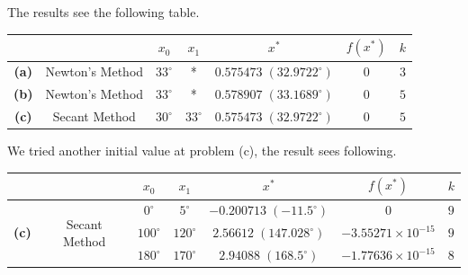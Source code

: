 \documentclass[11pt,en]{elegantpaper}
\begin{document}
The results see the following table.

\begin{table}[htbp]
  \centering
  \begin{tabular}{|cc|c|c|c|c|c|}
  \hline
  \multicolumn{2}{|c|}{\textbf{}}                      & \textbf{$x_0$} & \textbf{$x_1$} & \textbf{$x^*$}              & \textbf{$f(x^*)$} & \textbf{$k$} \\ \hline
  \multicolumn{1}{|c|}{\textbf{(a)}} & Newton's Method & $33^\circ$     & *              & $0.575473\;(32.9722^\circ)$ & $0$               & $3$          \\ \hline
  \multicolumn{1}{|c|}{\textbf{(b)}} & Newton's Method & $33^\circ$     & *              & $0.578907\;(33.1689^\circ)$ & $0$               & $5$          \\ \hline
  \multicolumn{1}{|c|}{\textbf{(c)}} & Secant Method   & $30^\circ$     & $33^\circ$     & $0.575473\;(32.9722^\circ)$ & $0$               & $5$          \\ \hline
  \end{tabular}
\end{table}

We tried another initial value at problem (c), the result sees following.

\begin{table}[htbp]
  \centering
  \begin{tabular}{|cc|c|c|c|c|c|}
  \hline
  \multicolumn{2}{|c|}{\textbf{}}                                                      & \textbf{$x_0$} & \textbf{$x_1$} & \textbf{$x^*$}             & \textbf{$f(x^*)$}         & \textbf{$k$} \\ \hline
  \multicolumn{1}{|c|}{\multirow{3}{*}{\textbf{(c)}}} & \multirow{3}{*}{Secant Method} & $0^\circ$      & $5^\circ$      & $-0.200713\;(-11.5^\circ)$ & $0$                       & $9$          \\ \cline{3-7} 
  \multicolumn{1}{|c|}{}                              &                                & $100^\circ$    & $120^\circ$    & $2.56612\;(147.028^\circ)$ & $-3.55271\times 10^{-15}$ & $9$          \\ \cline{3-7} 
  \multicolumn{1}{|c|}{}                              &                                & $180^\circ$    & $170^\circ$    & $2.94088\;(168.5^\circ)$   & $-1.77636\times 10^{-15}$ & $8$          \\ \hline
  \end{tabular}
  \end{table}
\end{document}
